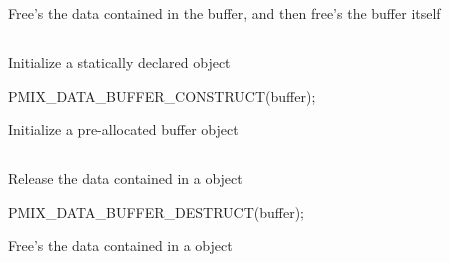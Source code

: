 \descr

Free's the data contained in the buffer, and then free's the buffer itself


\subsection{}

\summary

Initialize a statically declared  object

\format

\begin{signature}{2.0}
PMIX_DATA_BUFFER_CONSTRUCT(buffer);
\end{signature}

\begin{arglist}
\end{arglist}

\descr

Initialize a pre-allocated buffer object


\subsection{}

\summary

Release the data contained in a  object

\format

\begin{signature}{2.0}
PMIX_DATA_BUFFER_DESTRUCT(buffer);
\end{signature}

\begin{arglist}
\end{arglist}

\descr

Free's the data contained in a  object


\subsection{}

